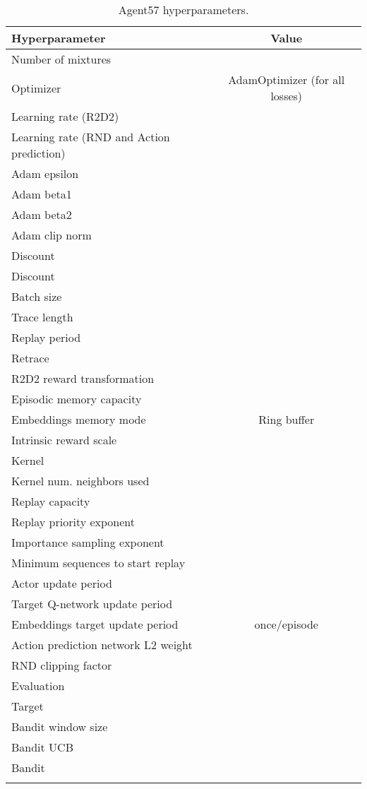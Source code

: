 \documentclass{article}
\begin{document}
\begin{small}
\begin{longtable}[!ht]{l|c}
\centering
\textbf{Hyperparameter} & \textbf{Value} \\ \hline
Number of mixtures  &  \\ \hline
Optimizer & AdamOptimizer (for all losses) \\ \hline
Learning rate (R2D2) &   \\ \hline
Learning rate (RND and Action prediction) &  \\ \hline
Adam epsilon &   \\ \hline
Adam beta1 &   \\ \hline
Adam beta2 &   \\ \hline
Adam clip norm &   \\ \hline
Discount  &  \\ \hline
Discount  &  \\ \hline
Batch size &  \\ \hline
Trace length &  \\ \hline
Replay period &  \\ \hline
Retrace  &  \\ \hline
R2D2 reward transformation &  \\ \hline
Episodic memory capacity &  \\ \hline
Embeddings memory mode & Ring buffer\\ \hline
Intrinsic reward scale  &  \\ \hline
Kernel  &  \\ \hline
Kernel num. neighbors used &  \\ \hline 
Replay capacity &  \\ \hline
Replay priority exponent &  \\ \hline 
Importance sampling exponent &  \\ \hline 
Minimum sequences to start replay &  \\ \hline 
Actor update period &  \\ \hline
Target Q-network update period &  \\ \hline
Embeddings target update period & once/episode \\ \hline
Action prediction network L2 weight &  \\ \hline
RND clipping factor  &  \\ \hline
Evaluation  &  \\ \hline
Target  &  \\ \hline
Bandit window size &  \\ \hline
Bandit UCB  &  \\ \hline
Bandit  &  \\ \hline
\caption{Agent57 hyperparameters.}
\label{tab:hyperparameters}
\vspace{-2ex}
\end{longtable}
\end{small}
\end{document}
